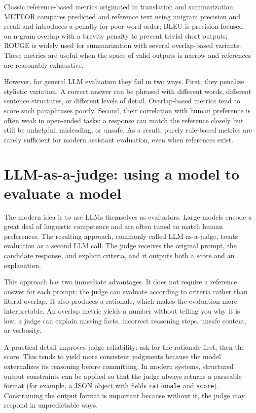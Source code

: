 Classic reference-based metrics originated in translation and summarization. METEOR compares predicted and reference text using unigram precision and recall and introduces a penalty for poor word order; BLEU is precision-focused on n-gram overlap with a brevity penalty to prevent trivial short outputs; ROUGE is widely used for summarization with several overlap-based variants. These metrics are useful when the space of valid outputs is narrow and references are reasonably exhaustive.

However, for general LLM evaluation they fail in two ways. First, they penalize stylistic variation. A correct answer can be phrased with different words, different sentence structures, or different levels of detail. Overlap-based metrics tend to score such paraphrases poorly. Second, their correlation with human preference is often weak in open-ended tasks: a response can match the reference closely but still be unhelpful, misleading, or unsafe. As a result, purely rule-based metrics are rarely sufficient for modern assistant evaluation, even when references exist.

\section{LLM-as-a-judge: using a model to evaluate a model}
The modern idea is to use LLMs themselves as evaluators. Large models encode a great deal of linguistic competence and are often tuned to match human preferences. The resulting approach, commonly called LLM-as-a-judge, treats evaluation as a second LLM call. The judge receives the original prompt, the candidate response, and explicit criteria, and it outputs both a score and an explanation.

This approach has two immediate advantages. It does not require a reference answer for each prompt; the judge can evaluate according to criteria rather than literal overlap. It also produces a rationale, which makes the evaluation more interpretable. An overlap metric yields a number without telling you why it is low; a judge can explain missing facts, incorrect reasoning steps, unsafe content, or verbosity.

A practical detail improves judge reliability: ask for the rationale first, then the score. This tends to yield more consistent judgments because the model externalizes its reasoning before committing. In modern systems, structured output constraints can be applied so that the judge always returns a parseable format (for example, a JSON object with fields \texttt{rationale} and \texttt{score}). Constraining the output format is important because without it, the judge may respond in unpredictable ways.

